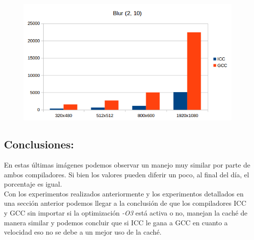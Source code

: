 \begin{figure}[H]
\begin{center}
  \includegraphics[width=\linewidth]{cachecompiladores/blur210.png}
\end{center}
\end{figure}

\subsection{Conclusiones:}
En estas últimas imágenes podemos observar un manejo muy similar por parte de ambos compiladores. Si bien los valores pueden diferir un poco, al final del día, el porcentaje es igual.\\
Con los experimentos realizados anteriormente y los experimentos detallados en una sección anterior podemos llegar a la conclusión de que los compiladores ICC y GCC sin importar si la optimización \textit{-O3} está activa o no, manejan la caché de manera similar y podemos concluir que si ICC le gana a GCC en cuanto a velocidad eso no se debe a un mejor uso de la caché.

